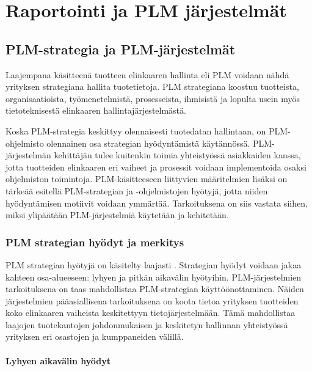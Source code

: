 \chapter{Raportointi ja PLM järjestelmät} \label{Raportointi ja PLM järjestelmät}

\section{PLM-strategia ja PLM-järjestelmät} \label{PLM-järjestelmät}

Laajempana käsitteenä tuotteen elinkaaren hallinta eli PLM voidaan nähdä yrityksen strategiana hallita tuotetietoja. PLM strategiana koostuu tuotteista, organisaatioista, työmenetelmistä, prosesseista, ihmisistä ja lopulta usein myös tietoteknisestä elinkaaren hallintajärjestelmästä.

Koska PLM-strategia keskittyy olennaisesti tuotedatan hallintaan, on PLM-ohjelmisto olennainen osa strategian hyödyntämistä käytännössä. PLM-järjestelmän kehittäjän tulee kuitenkin toimia yhteistyössä asiakkaiden kanssa, jotta tuotteiden elinkaaren eri vaiheet ja prosessit voidaan implementoida osaksi ohjelmiston toimintoja. PLM-käsitteeseen liittyvien määritelmien lisäksi on tärkeää esitellä PLM-strategian ja -ohjelmistojen hyötyjä, jotta niiden hyödyntämisen motiivit voidaan ymmärtää. Tarkoituksena on siis vastata siihen, miksi ylipäätään PLM-järjestelmiä käytetään ja kehitetään. \cite{alemanni_key_2008}

\subsection{PLM strategian hyödyt ja merkitys} \label{PLM strategian hyödyt}

PLM strategian hyötyjä on käsitelty laajasti \cite{alemanni_key_2008} \cite{rivest_product_2012}. Strategian hyödyt voidaan jakaa kahteen osa-alueeseen: lyhyen ja pitkän aikavälin hyötyihin. PLM-järjestelmien tarkoituksena on taas mahdollistaa PLM-strategian käyttöönottaminen. Näiden järjestelmien pääasiallisena tarkoituksena on koota tietoa yrityksen tuotteiden koko elinkaaren vaiheista keskitettyyn tietojärjestelmään. Tämä mahdollistaa laajojen tuotekantojen johdonmukaisen ja keskitetyn hallinnan yhteistyössä yrityksen eri osastojen ja kumppaneiden välillä.

\subsubsection{Lyhyen aikavälin hyödyt} \label{Lyhyen aikavälin hyödyt}

